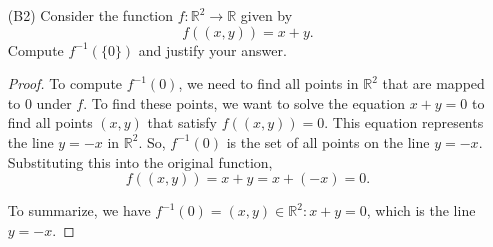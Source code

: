 \documentclass{article}
\begin{document}
\begin{itemize}
	\item [(B2)] Consider the function $f : \mathbb{R}^2 \rightarrow \mathbb{R}$ given by
		\[
			f((x,y)) = x + y.
		\]
		Compute $f^{-1}( \{ 0 \} )$ and justify your answer.
            \begin{proof}
                To compute $f^{-1}({0})$, we need to find all points in $\mathbb{R}^2$ that are mapped to 0 under $f$. To find these points, we want to solve the equation $x+y=0$ to find all points $(x,y)$ that satisfy $f((x,y))=0$.
                This equation represents the line $y=-x$ in $\mathbb{R}^2$. So, $f^{-1}({0})$ is the set of all points on the line $y=-x$. Substituting this into the original function,
                \[
                    f((x, y)) = x + y = x + (\minus x) = 0.
                \]

                To summarize, we have $f^{-1}({0}) = {(x,y) \in \mathbb{R}^2 : x+y = 0}$, which is the line $y=-x$.
            \end{proof}
    \end{itemize}
\end{document}

